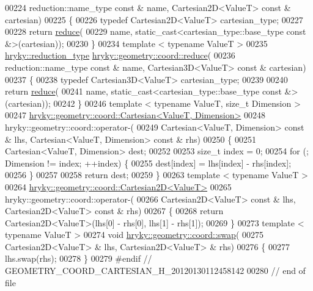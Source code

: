 \begin{DoxyCode}
00224     reduction::name\_type \textcolor{keyword}{const} & name, Cartesian2D<ValueT> \textcolor{keyword}{const} & cartesian)
00225 \{
00226     \textcolor{keyword}{typedef} Cartesian2D<ValueT> cartesian\_type;
00227     
00228     \textcolor{keywordflow}{return} \hyperlink{namespacehryky_af41cb3af6766761da0ff21b84527a52c}{reduce}(
00229         name, static\_cast<cartesian\_type::base\_type const &>(cartesian));
00230 \}
00234 \textcolor{keyword}{template} < \textcolor{keyword}{typename} ValueT >
00235 \hyperlink{classhryky_1_1_intrusive_ptr}{hryky::reduction_type} \hyperlink{namespacehryky_1_1geometry_a18354ece30244aa68fc3744f2cdb41fc}{hryky::geometry::coord::reduce}(
00236     reduction::name\_type \textcolor{keyword}{const} & name, Cartesian3D<ValueT> \textcolor{keyword}{const} & cartesian)
00237 \{
00238     \textcolor{keyword}{typedef} Cartesian3D<ValueT> cartesian\_type;
00239     
00240     \textcolor{keywordflow}{return} \hyperlink{namespacehryky_af41cb3af6766761da0ff21b84527a52c}{reduce}(
00241         name, static\_cast<cartesian\_type::base\_type const &>(cartesian));
00242 \}
00246 \textcolor{keyword}{template} < \textcolor{keyword}{typename} ValueT, \textcolor{keywordtype}{size\_t} Dimension >
00247 \hyperlink{classhryky_1_1geometry_1_1coord_1_1_cartesian}{hryky::geometry::coord::Cartesian<ValueT, Dimension>} 
00248 hryky::geometry::coord::operator-(
00249     Cartesian<ValueT, Dimension> \textcolor{keyword}{const} & lhs, Cartesian<ValueT, Dimension> \textcolor{keyword}{
      const} & rhs)
00250 \{
00251     Cartesian<ValueT, Dimension> dest;
00252     
00253     \textcolor{keywordtype}{size\_t} index = 0;
00254     \textcolor{keywordflow}{for} (; Dimension != index; ++index) \{
00255         dest[index] = lhs[index] - rhs[index];
00256     \}
00257     
00258     \textcolor{keywordflow}{return} dest;
00259 \}
00263 \textcolor{keyword}{template} < \textcolor{keyword}{typename} ValueT >
00264 \hyperlink{classhryky_1_1geometry_1_1coord_1_1_cartesian2_d}{hryky::geometry::coord::Cartesian2D<ValueT>}
00265 hryky::geometry::coord::operator-(
00266     Cartesian2D<ValueT> \textcolor{keyword}{const} & lhs, Cartesian2D<ValueT> \textcolor{keyword}{const} & rhs)
00267 \{
00268     \textcolor{keywordflow}{return} Cartesian2D<ValueT>(lhs[0] - rhs[0], lhs[1] - rhs[1]);
00269 \}
00273 \textcolor{keyword}{template} < \textcolor{keyword}{typename} ValueT >
00274 \textcolor{keywordtype}{void} \hyperlink{namespacehryky_1_1geometry_a73028b267b1f3811ebacb86acbee6742}{hryky::geometry::coord::swap}(
00275     Cartesian2D<ValueT> & lhs, Cartesian2D<ValueT> & rhs)
00276 \{
00277     lhs.swap(rhs);
00278 \}
00279 \textcolor{preprocessor}{#endif // GEOMETRY\_COORD\_CARTESIAN\_H\_20120130112458142}
00280 \textcolor{preprocessor}{}\textcolor{comment}{// end of file}
\end{DoxyCode}
